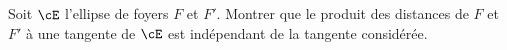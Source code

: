 \begin{enonce}
\begin{exercise}[ID={RMS 122-2 E558 Mines-Ponts PSI},subtitle={},tags={}, difficulty={0}]
Soit $\cE$ l'ellipse de foyers $F$ et $F'$.
Montrer que le produit des distances de $F$ et $F'$ à une tangente de $\cE$ est indépendant de la tangente considérée.
\end{exercise}
\begin{solution}
\end{solution}
\end{enonce}
